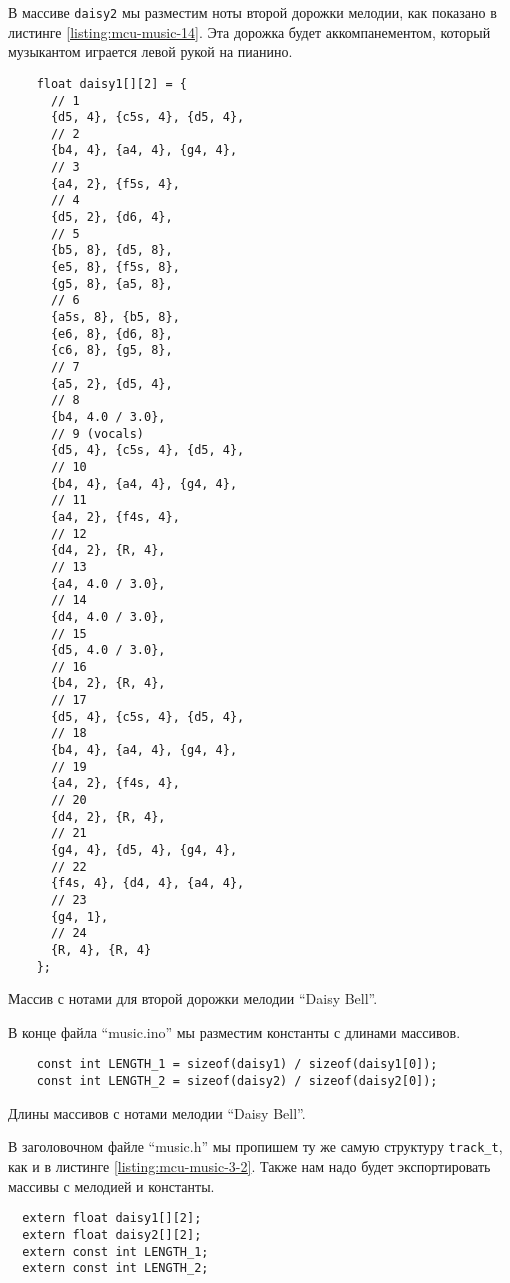 \documentclass[../sparc.tex]{subfiles}
\begin{document}
В массиве \texttt{daisy2} мы разместим ноты второй дорожки мелодии, как
показано в листинге \ref{listing:mcu-music-14}.  Эта дорожка будет
аккомпанементом, который музыкантом играется левой рукой на пианино.

\begin{listing}[ht]
  \begin{verbatim}
    float daisy1[][2] = {
      // 1
      {d5, 4}, {c5s, 4}, {d5, 4},
      // 2
      {b4, 4}, {a4, 4}, {g4, 4},
      // 3
      {a4, 2}, {f5s, 4},
      // 4
      {d5, 2}, {d6, 4},
      // 5
      {b5, 8}, {d5, 8},
      {e5, 8}, {f5s, 8},
      {g5, 8}, {a5, 8},
      // 6
      {a5s, 8}, {b5, 8},
      {e6, 8}, {d6, 8},
      {c6, 8}, {g5, 8},
      // 7
      {a5, 2}, {d5, 4},
      // 8
      {b4, 4.0 / 3.0},
      // 9 (vocals)
      {d5, 4}, {c5s, 4}, {d5, 4},
      // 10
      {b4, 4}, {a4, 4}, {g4, 4},
      // 11
      {a4, 2}, {f4s, 4},
      // 12
      {d4, 2}, {R, 4},
      // 13
      {a4, 4.0 / 3.0},
      // 14
      {d4, 4.0 / 3.0},
      // 15
      {d5, 4.0 / 3.0},
      // 16
      {b4, 2}, {R, 4},
      // 17
      {d5, 4}, {c5s, 4}, {d5, 4},
      // 18
      {b4, 4}, {a4, 4}, {g4, 4},
      // 19
      {a4, 2}, {f4s, 4},
      // 20
      {d4, 2}, {R, 4},
      // 21
      {g4, 4}, {d5, 4}, {g4, 4},
      // 22
      {f4s, 4}, {d4, 4}, {a4, 4},
      // 23
      {g4, 1},
      // 24
      {R, 4}, {R, 4}
    };
  \end{verbatim}
  \caption{Массив с нотами для второй дорожки мелодии ``Daisy Bell''.}
  \label{listing:mcu-music-14}
\end{listing}

В конце файла ``music.ino'' мы разместим константы с длинами массивов.

\begin{listing}[H]
  \begin{verbatim}
    const int LENGTH_1 = sizeof(daisy1) / sizeof(daisy1[0]);
    const int LENGTH_2 = sizeof(daisy2) / sizeof(daisy2[0]);
  \end{verbatim}
  \caption{Длины массивов с нотами мелодии ``Daisy Bell''.}
  \label{listing:mcu-music-15}
\end{listing}

В заголовочном файле ``music.h'' мы пропишем ту же самую структуру
\texttt{track_t}, как и в листинге \ref{listing:mcu-music-3-2}.  Также
нам надо будет экспортировать массивы с мелодией и константы.

\begin{verbatim}
  extern float daisy1[][2];
  extern float daisy2[][2];
  extern const int LENGTH_1;
  extern const int LENGTH_2;
\end{verbatim}
\end{document}
